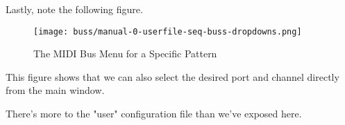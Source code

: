    Lastly, note the following figure.

\begin{figure}[H]
   \centering 
   \texttt{[image: buss/manual-0-userfile-seq-buss-dropdowns.png]}
   \caption{The MIDI Bus Menu for a Specific Pattern}
   \label{fig:seq64_manual_0_userfile_seq_buss_dropdown}
\end{figure}

   This figure shows that we can also select the desired port and channel
   directly from the main window.

   There's more to the "user" configuration file than we've exposed here.


